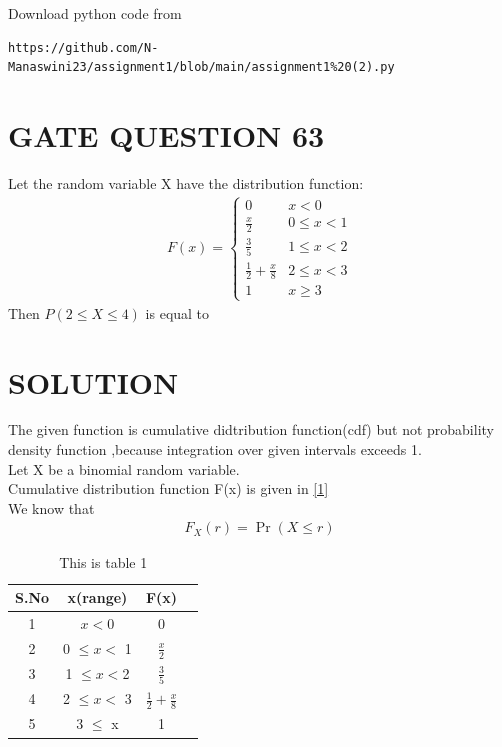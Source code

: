 \documentclass[journal,12pt,twocolumn]{IEEEtran}
\begin{document}
\renewcommand{\thefigure}{\theenumi}
\renewcommand{\thetable}{\theenumi}
Download python code from 
\begin{lstlisting}
https://github.com/N-Manaswini23/assignment1/blob/main/assignment1%20(2).py
\end{lstlisting}
%

\section*{GATE QUESTION 63}
Let the random variable X have the distribution function:
\begin{align}
F(x) = \begin{cases}
0 & x < 0
\\
\frac{x}{2} & 0 \leq x < 1 
\\
\frac{3}{5} & 1 \leq x < 2
\\
\frac{1}{2}+\frac{x}{8} & 2 \leq x < 3
\\
1 & x \geq 3
\end{cases} \label{1}
\end{align}
Then $P (2 \leq X \leq 4)$ is equal to


\section*{SOLUTION}
The given function is cumulative didtribution function(cdf) but not probability density function ,because integration over given intervals exceeds 1.\\
Let X be a binomial random variable. \\
Cumulative distribution function F(x) is given in \eqref{1}\\
We know that
\begin{align}
F_X(r) = \Pr (X \leq r) 
\end{align}

\begin{table}[h!]
\resizebox{7cm}{!}
{ 
\begin{tabular}{|c|c|c|c|}
\hline
S.No & x(range) & F(x) \\
\hline
1 & $x < 0$ & 0 \\
\hline
2 & 0 $\leq x < $ 1 & $\frac{x}{2}$\\
\hline
3 & 1 $\leq  x < $2 & $\frac{3}{5}$\\
\hline
4 & 2 $\leq x  < $ 3 & $\frac{1}{2}+\frac{x}{8}$  \\
\hline
5 & 3 $\leq$ x & 1\\
\hline
\end{tabular} 
}
\caption{This is table 1}
\label{table:1}
\end{table}
\end{document}
